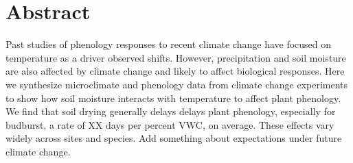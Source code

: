 \documentclass{article}
\begin{document}
\clearpage
\section*{Abstract}
Past studies of phenology responses to recent climate change have focused on temperature as a driver observed shifts. However, precipitation and soil moisture are also affected by climate change and likely to affect biological responses. Here we synthesize microclimate and phenology data from climate change experiments to show how soil moisture interacts with temperature to affect plant phenology. We find that soil drying generally delays delays plant phenology, especially for budburst, a rate of XX days per percent VWC, on average. These effects vary widely across sites and species. Add something about expectations under future climate change. 
\end{document}
